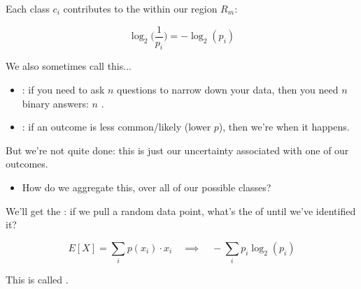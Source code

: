        \begin{kequation}
            Each class $c_i$ contributes to the  within our region $R_m$: 

            \begin{equation*}
                \log_2 \Bigg( \frac{1}{p_i} \Bigg) = - \log_2 (p_i)
            \end{equation*}

            We also sometimes call this...

            \begin{itemize}
                \item {}: if you need to ask $n$ questions to narrow down your data, then you need $n$ binary answers: $n$ .

                \item {}: if an outcome is less common/likely (lower $p$), then we're  when it happens.
            \end{itemize}
        \end{kequation}

        But we're not quite done: this is just our uncertainty associated with one of our outcomes.

        \begin{itemize}
            \item How do we aggregate this, over all of our possible classes?
        \end{itemize}

        We'll get the : if we pull a random data point, what's the  of  until we've identified it?

        \begin{equation}
            E[X] = \sum_i p(x_i) \cdot x_i \quad \implies \quad 
            - \sum_i p_i \log_2 (p_i)
        \end{equation}

        This is called .\\

